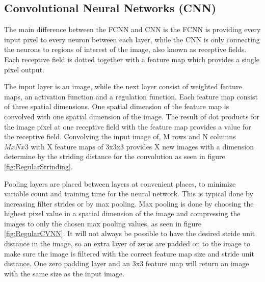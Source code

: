 \FloatBarrier

\subsection{Convolutional Neural Networks (CNN)}

The main difference between the FCNN and CNN is the FCNN is providing every input pixel to every neuron between each layer, while the CNN is only connecting the neurons to regions of interest of the image, also known as receptive fields. Each receptive field is dotted together with a feature map which provides a single pixel output.

The input layer is an image, while the next layer consist of weighted feature maps, an activation function and a regulation function. Each feature map consist of three spatial dimensions. One spatial dimension of the feature map is convolved with one spatial dimension of the image. The result of dot products for the image pixel at one receptive field with the feature map provides a value for the receptive field. Convolving the input image of, M rows and N columns $MxNx3$ with X feature maps of 3x3x3 provides X new images with a dimension determine by the striding distance for the convolution as seen in figure \ref{fig:RegularStrinding}.

\FloatBarrier

Pooling layers are placed between layers at convenient places, to minimize variable count and training time for the neural network. This is typical done by increasing filter strides or by max pooling. Max pooling is done by choosing the highest pixel value in a spatial dimension of the image and compressing the images to only the chosen max pooling values, as seen in figure \ref{fig:RegularCVNN}. It will not always be possible to have the desired stride unit distance in the image, so an extra layer of zeros are padded on to the image to make sure the image is filtered with the correct feature map size and stride unit distance. One zero padding layer and an 3x3 feature map will return an image with the same size as the input image.

\FloatBarrier